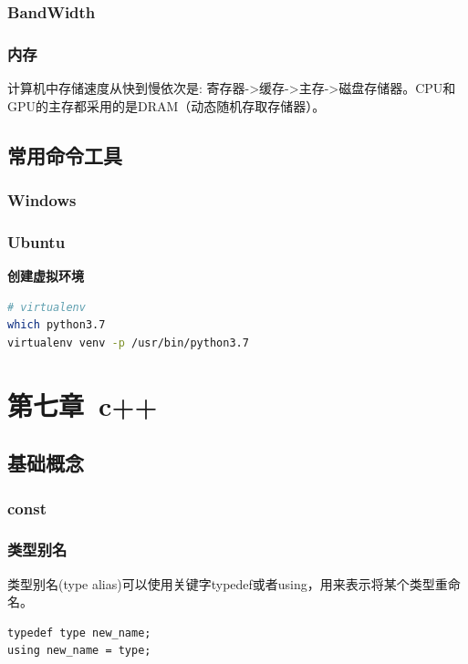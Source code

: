 \documentclass[12pt]{book}
\begin{document}
\subsection{BandWidth}

\subsection{内存}
计算机中存储速度从快到慢依次是: 寄存器->缓存->主存->磁盘存储器。CPU和GPU的主存都采用的是DRAM（动态随机存取存储器）。

\section{常用命令工具}
\subsection{Windows}
\subsection{Ubuntu}
\textbf{创建虚拟环境}
\begin{lstlisting}[language=bash]
# virtualenv
which python3.7
virtualenv venv -p /usr/bin/python3.7
\end{lstlisting}

\newpage

\fancyhead{}

\chapter{第七章\ c++}

\section{基础概念}
\subsection{const}
\subsection{类型别名}
类型别名(type alias)可以使用关键字typedef或者using，用来表示将某个类型重命名。
\begin{lstlisting}
typedef type new_name;
using new_name = type;
\end{lstlisting}
\end{document}
